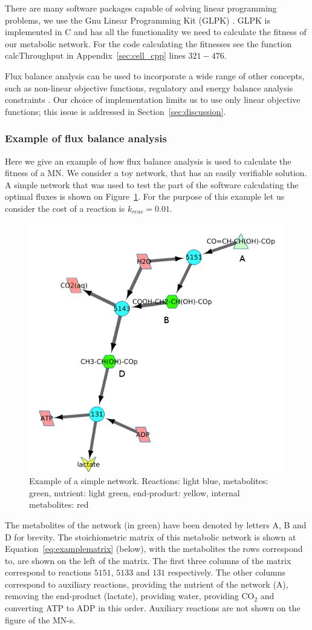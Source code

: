 \documentclass[a4paper,12pt]{article}
\begin{document}
	
	There are many software packages capable of solving linear programming problems, we use the Gnu Linear Programming Kit (GLPK) \cite{glpk}. GLPK is implemented in C and has all the functionality we need to calculate the fitness of our metabolic network. For the code calculating the fitnesses see the function calcThroughput in Appendix~\ref{sec:cell_cpp} lines $321-476$.

	Flux balance analysis can be used to incorporate a wide range of other concepts, such as non-linear objective functions, regulatory and energy balance analysis constraints \cite{fbaconstraints}. Our choice of implementation limits us to use only linear objective functions; this issue is addressed in Section~\ref{sec:discussion}.

\subsubsection{Example of flux balance analysis}
\label{sub:example_of_flux_balance_analysis}

Here we give an example of how flux balance analysis is used to calculate the fitness of a MN. We consider a toy network, that has an easily verifiable solution. A simple network that was used to test the part of the software calculating the optimal fluxes is shown on Figure~\ref{fig:examplenetwork}. For the purpose of this example let us consider the cost of a reaction is $k_{reac}=0.01$.

\begin{figure}[htbp]
	\centering
	\includegraphics[width=0.5\linewidth]{initial_network_ABC.png}
	\caption{Example of a simple network. Reactions: light blue, metabolites: green, nutrient: light green, end-product: yellow, internal metabolites: red}
	\label{fig:examplenetwork}
\end{figure}

	The metabolites of the network (in green) have been denoted by letters A, B and D for brevity. The stoichiometric matrix of this metabolic network is shown at Equation~\ref{eq:examplematrix} (below), with the metabolites the rows correspond to, are shown on the left of the matrix. The first three columns of the matrix correspond to reactions $5151$, $5133$ and $131$ respectively. The other columns correspond to auxiliary reactions, providing the nutrient of the network (A), removing the end-product (lactate), providing water, providing CO$_2$ and converting ATP to ADP in this order. Auxiliary reactions are not shown on the figure of the MN-s. 
\end{document}
